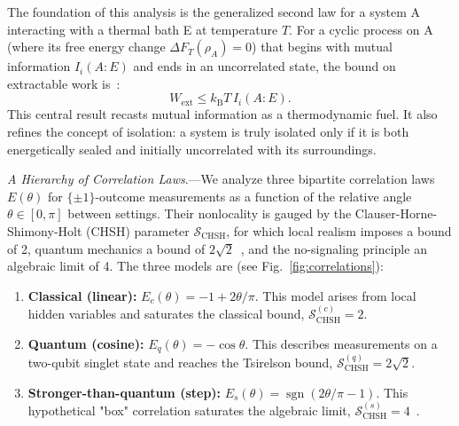 \documentclass[%
  reprint,
  showpacs,
  showkeys,
  prl,
  floatfix
]{revtex4-2}
\begin{document}
The foundation of this analysis is the generalized second law for a system A interacting with a thermal bath E at temperature $T$. For a cyclic process on A (where its free energy change $\Delta F_T(\rho_A)=0$) that begins with mutual information $I_i(A:E)$ and ends in an uncorrelated state, the bound on extractable work is~\cite[Equ.~(4)]{Bera2017a}:
\begin{equation}
W_{\mathrm{ext}} \le k_{\mathrm{B}} T\, I_i(A:E).
\label{eq:work_from_I}
\end{equation}
This central result recasts mutual information as a thermodynamic fuel. It also refines the concept of isolation: a system is truly isolated only if it is both energetically sealed and initially uncorrelated with its surroundings.

\textit{A Hierarchy of Correlation Laws}.---We analyze three bipartite correlation laws $E(\theta)$ for $\{\pm1\}$-outcome measurements as a function of the relative angle $\theta \in [0, \pi]$ between settings. Their nonlocality is gauged by the Clauser-Horne-Shimony-Holt (CHSH) parameter $\mathcal{S}_{\mathrm{CHSH}}$, for which local realism imposes a bound of 2, quantum mechanics a bound of $2\sqrt{2}$~\cite{cirelson:80}, and the no-signaling principle an algebraic limit of 4. The three models are (see Fig.~\ref{fig:correlations}):
\begin{enumerate}
    \item \textbf{Classical (linear):} $E_c(\theta) = -1 + 2\theta/\pi$. This model arises from local hidden variables and saturates the classical bound, $\mathcal{S}_{\mathrm{CHSH}}^{(c)} = 2$.
    \item \textbf{Quantum (cosine):} $E_q(\theta) = -\cos\theta$. This describes measurements on a two-qubit singlet state and reaches the Tsirelson bound, $\mathcal{S}_{\mathrm{CHSH}}^{(q)} = 2\sqrt{2}$.
    \item \textbf{Stronger-than-quantum (step):} $E_s(\theta) = \operatorname{sgn}(2\theta/\pi - 1)$. This hypothetical "box" correlation saturates the algebraic limit, $\mathcal{S}_{\mathrm{CHSH}}^{(s)} = 4$~\cite{pop-rohr,svozil-krenn}.
\end{enumerate}
\end{document}
